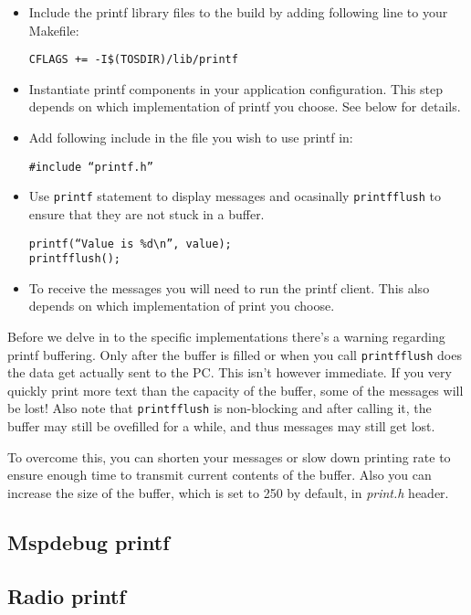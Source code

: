 \begin{itemize}
  \item Include the printf library files to the build by adding
    following line to your Makefile:

    \texttt{CFLAGS += -I\$(TOSDIR)/lib/printf}

  \item Instantiate printf components in your application
    configuration. This step depends on which implementation of
    printf you choose. See below for details.

  \item Add following include in the file you wish to use printf in:

    \texttt{\#include ``printf.h''}

  \item Use \texttt{printf} statement to display messages and
    ocasinally \texttt{printfflush} to ensure that they are not stuck
    in a buffer.

    \texttt{printf(``Value is \%d\textbackslash n'', value);} \\
    \texttt{printfflush();}

  \item To receive the messages you will need to run the printf
    client. This also depends on which implementation of print you
    choose.
\end{itemize}

Before we delve in to the specific implementations there's a warning
regarding printf buffering. Only after the buffer is filled or when
you call \texttt{printfflush} does the data get actually sent to the
PC. This isn't however immediate. If you very quickly print more text
than the capacity of the buffer, some of the messages will be lost!
Also note that \texttt{printfflush} is non-blocking and after calling
it, the buffer may still be ovefilled for a while, and thus messages
may still get lost.

To overcome this,  you can shorten your messages or slow down printing
rate to ensure enough time to transmit current contents of the buffer.
Also you can increase the size of the buffer, which is set to 250 by
default, in \emph{print.h} header.

\subsection{Mspdebug printf}

\subsection{Radio printf}

